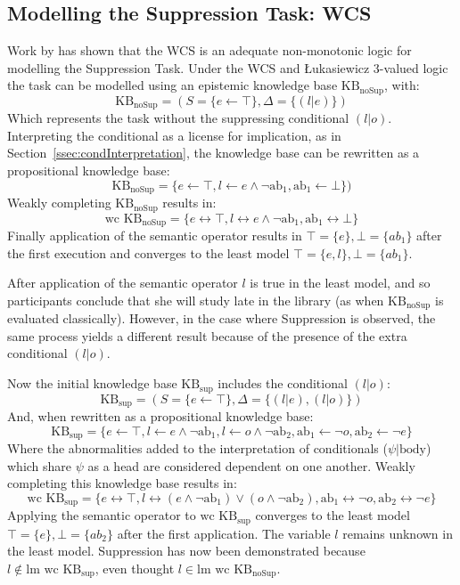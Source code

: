 \subsection{Modelling the Suppression Task: WCS} \label{ssec:sup_mod}
Work by \cite{dietz2014modeling} has shown that the WCS is an adequate non-monotonic logic for modelling the Suppression Task. Under the WCS and \L ukasiewicz 3-valued logic the task can be modelled using an epistemic knowledge base $\text{KB}_\text{noSup}$, with:
\[\text{KB}_\text{noSup}=(S=\{e \leftarrow \top\}, \Delta=\{(l|e)\})\]
Which represents the  task without the suppressing conditional $(l|o)$. Interpreting the conditional as a license for implication, as in Section~\ref{ssec:condInterpretation}, the knowledge base can be rewritten as a propositional knowledge base:
\[\text{KB}_\text{noSup}=\{e \leftarrow \top, l \leftarrow e \land \lnot \text{ab}_1, \text{ab}_1\leftarrow \bot\})\]
Weakly completing $\text{KB}_\text{noSup}$ results in:
\[\text{wc KB}_\text{noSup}=\{e \leftrightarrow \top, l \leftrightarrow e \land \lnot \text{ab}_1, \text{ab}_1\leftrightarrow \bot\}\]
Finally application of the semantic operator results in $\top=\{e\}, \bot=\{ab_1\}$ after the first execution and converges to the least model $\top=\{e,l\}, \bot=\{ab_1\}$.

After application of the semantic operator $l$ is true in the least model, and so participants conclude that she will study late in the library (as when $\text{KB}_\text{noSup}$ is evaluated classically). However, in the case where Suppression is observed, the same process yields a different result because of the presence of the extra conditional $(l|o)$.

Now the initial knowledge base $\text{KB}_\text{sup}$ includes the conditional $(l|o)$:
\[\text{KB}_\text{sup}=(S=\{e \leftarrow \top\}, \Delta=\{(l|e),(l|o)\})\]
And, when rewritten as a propositional knowledge base:
\[\text{KB}_\text{sup}=\{e \leftarrow \top, l \leftarrow e \land \lnot \text{ab}_1, l \leftarrow o \land \lnot \text{ab}_2, \text{ab}_1\leftarrow \lnot o, \text{ab}_2\leftarrow \lnot e\}\]
Where the abnormalities added to the interpretation of conditionals ($\psi|\text{body}$) which share $\psi$ as a head are considered dependent on one another. Weakly completing this knowledge base results in:
\[\text{wc KB}_\text{sup}=\{e \leftrightarrow \top, l \leftrightarrow (e \land \lnot \text{ab}_1) \lor (o \land \lnot \text{ab}_2), \text{ab}_1\leftrightarrow \lnot o, \text{ab}_2\leftrightarrow \lnot e\}\]
Applying the semantic operator to $\text{wc KB}_\text{sup}$ converges to the least model $\top=\{e\},\bot=\{ab_2\}$ after the first application. The variable $l$ remains unknown in the least model. Suppression has now been demonstrated because $l \not\in \text{lm wc KB}_\text{sup}$, even thought $l \in \text{lm wc KB}_\text{noSup}$.

